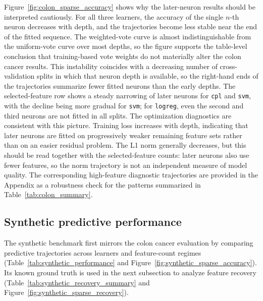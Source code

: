 Figure~\ref{fig:colon_sparse_accuracy} shows why the later-neuron results should be interpreted cautiously.
For all three learners, the accuracy of the single $n$-th neuron decreases with depth, and the trajectories become
less stable near the end of the fitted sequence.
The weighted-vote curve is almost indistinguishable from the uniform-vote curve over most depths, so the figure
supports the table-level conclusion that training-based vote weights do not materially alter the colon cancer
results.
This instability coincides with a decreasing number of cross-validation splits in which that neuron depth is
available, so the right-hand ends of the trajectories summarize fewer fitted neurons than the early depths.
The selected-feature row shows a steady narrowing of later neurons for \texttt{cpl} and \texttt{svm}, with the
decline being more gradual for \texttt{svm}; for \texttt{logreg}, even the second and third neurons are not fitted
in all splits.
The optimization diagnostics are consistent with this picture.
Training loss increases with depth, indicating that later neurons are fitted on progressively weaker remaining
feature sets rather than on an easier residual problem.
The L1 norm generally decreases, but this should be read together with the selected-feature counts: later neurons
also use fewer features, so the norm trajectory is not an independent measure of model quality.
The corresponding high-feature diagnostic trajectories are provided in the Appendix as a robustness check for the
patterns summarized in Table~\ref{tab:colon_summary}.

\FloatBarrier

\subsection*{Synthetic predictive performance}
The synthetic benchmark first mirrors the colon cancer evaluation by comparing predictive trajectories across
learners and feature-count regimes (Table~\ref{tab:synthetic_performance} and
Figure~\ref{fig:synthetic_sparse_accuracy}). Its known ground truth is used in the next subsection to analyze
feature recovery (Table~\ref{tab:synthetic_recovery_summary} and Figure~\ref{fig:synthetic_sparse_recovery}).

